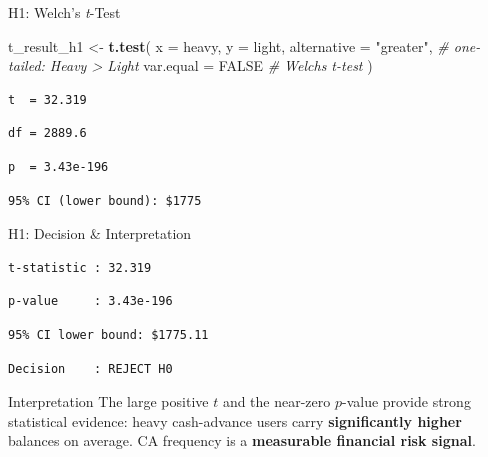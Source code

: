 \documentclass[
  ignorenonframetext,
  aspectratio=169]{beamer}
\newenvironment{Shaded}{\begin{snugshade}}{\end{snugshade}}
\newcommand{\AttributeTok}[1]{\textcolor[rgb]{0.13,0.29,0.53}{#1}}
\newcommand{\CommentTok}[1]{\textcolor[rgb]{0.56,0.35,0.01}{\textit{#1}}}
\newcommand{\ConstantTok}[1]{\textcolor[rgb]{0.56,0.35,0.01}{#1}}
\newcommand{\FunctionTok}[1]{\textcolor[rgb]{0.13,0.29,0.53}{\textbf{#1}}}
\newcommand{\NormalTok}[1]{#1}
\newcommand{\OtherTok}[1]{\textcolor[rgb]{0.56,0.35,0.01}{#1}}
\newcommand{\StringTok}[1]{\textcolor[rgb]{0.31,0.60,0.02}{#1}}
\begin{document}
\begin{frame}[fragile]{H1: Welch's \emph{t}-Test}
\protect{}\label{h1-welchs-t-test}
\begin{Shaded}
\begin{Highlighting}[]
\NormalTok{t\_result\_h1 }\OtherTok{\textless{}{-}} \FunctionTok{t.test}\NormalTok{(}
  \AttributeTok{x           =}\NormalTok{ heavy,}
  \AttributeTok{y           =}\NormalTok{ light,}
  \AttributeTok{alternative =} \StringTok{"greater"}\NormalTok{,  }\CommentTok{\# one{-}tailed: Heavy \textgreater{} Light}
  \AttributeTok{var.equal   =} \ConstantTok{FALSE}       \CommentTok{\# Welch\textquotesingle{}s t{-}test}
\NormalTok{)}
\end{Highlighting}
\end{Shaded}

\begin{verbatim}
t  = 32.319
\end{verbatim}

\begin{verbatim}
df = 2889.6
\end{verbatim}

\begin{verbatim}
p  = 3.43e-196
\end{verbatim}

\begin{verbatim}
95% CI (lower bound): $1775
\end{verbatim}
\end{frame}

\begin{frame}[fragile]{H1: Decision \& Interpretation}
\protect{}\label{h1-decision-interpretation}
\begin{verbatim}
t-statistic : 32.319
\end{verbatim}

\begin{verbatim}
p-value     : 3.43e-196
\end{verbatim}

\begin{verbatim}
95% CI lower bound: $1775.11
\end{verbatim}

\begin{verbatim}
Decision    : REJECT H0
\end{verbatim}

\vspace{0.4em}

\begin{block}{Interpretation}
The large positive $t$ and the near-zero $p$-value provide strong statistical
evidence: heavy cash-advance users carry \textbf{significantly higher} balances on average.
CA frequency is a \textbf{measurable financial risk signal}.
\end{block}
\end{frame}
\end{document}
